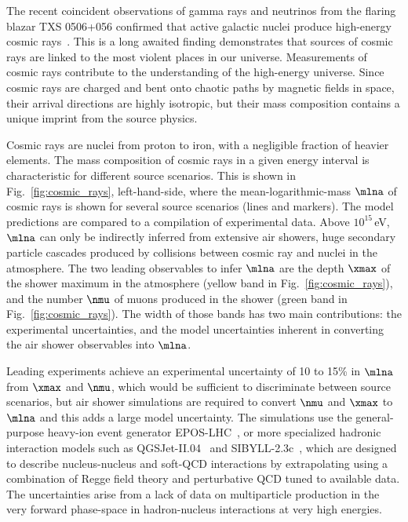 \documentclass[../report.tex]{subfiles}
\begin{document}
The recent coincident observations of gamma rays and neutrinos from the flaring blazar TXS 0506+056 confirmed that active galactic nuclei produce high-energy cosmic rays~\cite{IceCube:2018dnn}. This is a long awaited finding demonstrates that sources of cosmic rays are linked to the most violent places in our universe. Measurements of cosmic rays contribute to the understanding of the high-energy universe. Since cosmic rays are charged and bent onto chaotic paths by magnetic fields in space, their arrival directions are highly isotropic, but their mass composition contains a unique imprint from the source physics.

Cosmic rays are nuclei from proton to iron, with a negligible fraction of heavier elements. The mass composition of cosmic rays in a given energy interval is characteristic for different source scenarios. This is shown in Fig.~\ref{fig:cosmic_rays}, left-hand-side, where the mean-logarithmic-mass $\mlna$ of cosmic rays is shown for several source scenarios (lines and markers). The model predictions are compared to a compilation of experimental data. Above $10^{15}$\,\si{eV}, $\mlna$ can only be indirectly inferred from extensive air showers, huge secondary particle cascades produced by collisions between cosmic ray and nuclei in the atmosphere. The two leading observables to infer $\mlna$ are the depth $\xmax$ of the shower maximum in the atmosphere (yellow band in Fig.~\ref{fig:cosmic_rays}), and the number $\nmu$ of muons produced in the shower (green band in Fig.~\ref{fig:cosmic_rays}). The width of those bands has two main contributions: the experimental uncertainties, and the model uncertainties inherent in converting the air shower observables into $\mlna$.

Leading experiments achieve an experimental uncertainty of 10 to 15\% in $\mlna$ from $\xmax$ and $\nmu$, which would be sufficient to discriminate between source scenarios, but air shower simulations are required to convert $\nmu$ and $\xmax$ to $\mlna$ and this adds a large model uncertainty. The simulations use the general-purpose heavy-ion event generator EPOS-LHC~\cite{Werner:2005jf}, or more specialized hadronic interaction models such as \mbox{QGSJet-II.04}~\cite{Ostapchenko:2010vb} and SIBYLL-2.3c~\cite{Riehn:2017mfm}, which are designed to describe nucleus-nucleus and soft-QCD interactions by extrapolating using a combination of Regge field theory and perturbative QCD tuned to available data.
The uncertainties arise from a lack of data on multiparticle production in the very forward phase-space in hadron-nucleus interactions at very high energies.
\end{document}
